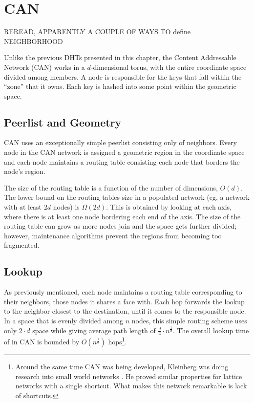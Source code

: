 \documentclass[10pt,letterpaper,twoside]{report}
\begin{document}
\section{CAN}
REREAD, APPARENTLY A COUPLE OF WAYS TO define NEIGHBORHOOD


Unlike the previous DHTs presented in this chapter, the Content Addressable Network (CAN) \cite{can} works in a $d$-dimensional torus, with the entire coordinate space divided among members.
A node is responsible for the keys  that fall within the ``zone'' that it owns.
Each key is hashed into some point within the geometric space.

\subsection*{Peerlist and Geometry}
CAN uses an exceptionally simple peerlist consisting only of neighbors.  
Every node in the CAN network is assigned a geometric region in the coordinate space and each node maintains a routing table consisting each node that borders the node's region.

The size of the routing table is a function of the number of dimensions, $O(d)$. 
The lower bound on the routing tables size in a populated network (eg, a network with at least $2d$ nodes) is $\Omega(2d)$.  
This is obtained by looking at each axis, where there is at least one node bordering each end of the axis.
The size of the routing table can grow as more nodes join and the space gets further divided; however, maintenance algorithms prevent the regions from becoming too fragmented.


\subsection*{Lookup}
As previously mentioned, each node maintains a routing table corresponding to their neighbors, those nodes it shares a face with.
Each hop forwards the lookup to the neighbor closest to the destination, until it comes to the responsible node.
In a space that is evenly divided among $n$ nodes, this simple routing scheme uses only $2 \cdot d$ space while giving average path length of $\frac{d}{4}\cdot n^{\frac{1}{d}}$.
The overall lookup time of in CAN is bounded by $O(n^{\frac{1}{d}})$ hops\footnote{Around the same time CAN was being developed, Kleinberg was doing research into small world networks \cite{kleinberg2000small}.  
He proved similar properties for lattice networks with a single shortcut.  What makes this network remarkable is lack of shortcuts.}.
\end{document}

